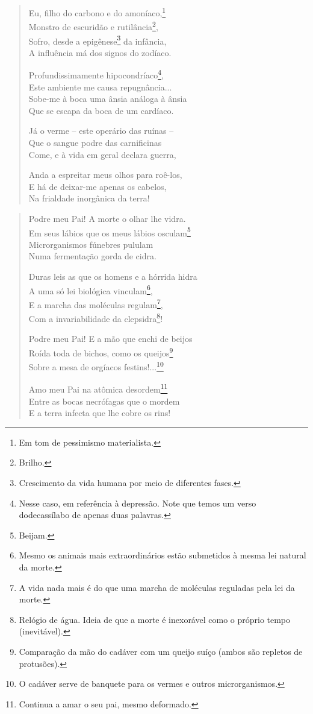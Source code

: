 \begin{verse}
Eu, filho do carbono e do amoníaco,\footnote{Em tom de pessimismo materialista.} \\
Monstro de escuridão e rutilância\footnote{Brilho.}, \\
Sofro, desde a epigênese\footnote{Crescimento da vida humana por meio de diferentes fases.} da infância, \\
A influência má dos signos do zodíaco.

Profundissimamente hipocondríaco\footnote{Nesse caso, em referência à depressão. Note que temos um verso dodecassílabo de apenas duas palavras.}, \\
Este ambiente me causa repugnância... \\
Sobe-me à boca uma ânsia análoga à ânsia \\
Que se escapa da boca de um cardíaco.

Já o verme -- este operário das ruínas -- \\
Que o sangue podre das carnificinas \\
Come, e à vida em geral declara guerra,

Anda a espreitar meus olhos para roê-los, \\
E há de deixar-me apenas os cabelos, \\
Na frialdade inorgânica da terra! 
\end{verse}

\begin{verse}
Podre meu Pai! A morte o olhar lhe vidra. \\
Em seus lábios que os meus lábios osculam\footnote{Beijam.} \\
Microrganismos fúnebres pululam \\
Numa fermentação gorda de cidra.

Duras leis as que os homens e a hórrida hidra \\
A uma só lei biológica vinculam\footnote{Mesmo os animais mais extraordinários estão submetidos à mesma lei natural da morte.}, \\
E a marcha das moléculas regulam\footnote{A vida nada mais é do que uma marcha de moléculas reguladas pela lei da morte.}, \\
Com a invariabilidade da clepsidra\footnote{Relógio de água. Ideia de que a morte é inexorável como o próprio tempo (inevitável).}!

Podre meu Pai! E a mão que enchi de beijos \\
Roída toda de bichos, como os queijos\footnote{Comparação da mão do cadáver com um queijo suíço (ambos são repletos de protusões).} \\
Sobre a mesa de orgíacos festins!...\footnote{O cadáver serve de banquete para os vermes e outros microrganismos.}

Amo meu Pai na atômica desordem\footnote{Continua a amar o seu pai, mesmo deformado.} \\
Entre as bocas necrófagas que o mordem \\
E a terra infecta que lhe cobre os rins! 
\end{verse}

